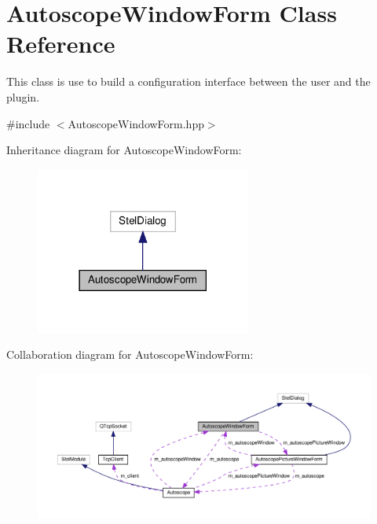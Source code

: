 \hypertarget{class_autoscope_window_form}{}\section{Autoscope\+Window\+Form Class Reference}
\label{class_autoscope_window_form}


This class is use to build a configuration interface between the user and the plugin.  




{\ttfamily \#include $<$Autoscope\+Window\+Form.\+hpp$>$}



Inheritance diagram for Autoscope\+Window\+Form\+:\nopagebreak
\begin{figure}[H]
\begin{center}
\leavevmode
\includegraphics[width=201pt]{class_autoscope_window_form__inherit__graph}
\end{center}
\end{figure}


Collaboration diagram for Autoscope\+Window\+Form\+:
\nopagebreak
\begin{figure}[H]
\begin{center}
\leavevmode
\includegraphics[width=350pt]{class_autoscope_window_form__coll__graph}
\end{center}
\end{figure}
